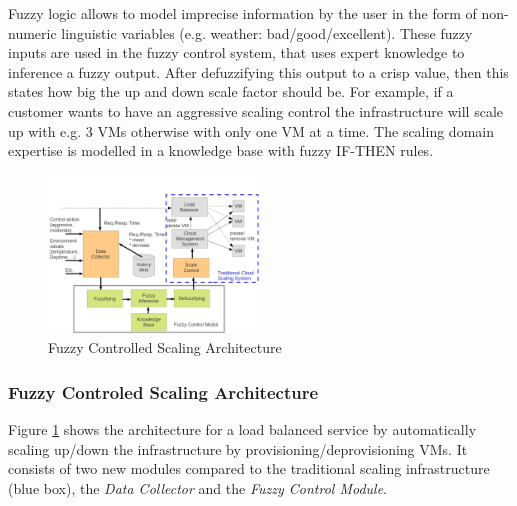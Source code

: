 Fuzzy logic allows to model imprecise information by the user in the form of non-numeric linguistic variables (e.g. weather: bad/good/excellent). These fuzzy inputs are used in the fuzzy control system, that uses expert knowledge to inference a fuzzy output. After defuzzifying this output to a crisp value, then this states how big the up and down scale factor should be. For example, if a customer wants to have an aggressive scaling control the infrastructure will scale up with e.g. 3 VMs otherwise with only one VM at a time. The scaling domain expertise is modelled in a knowledge base with fuzzy IF-THEN rules.


\begin{figure}[ht]
\begin{center}
\includegraphics[width=0.5\textwidth]{fig/architecture}
\end{center}
\caption{Fuzzy Controlled Scaling Architecture}
\label{fig:fuzzy_control_architecture}
\end{figure}

\subsubsection{Fuzzy Controled Scaling Architecture}\label{fuzzyScalingArchtecture}
Figure \ref{fig:fuzzy_control_architecture} shows the architecture for a load balanced service by automatically scaling up/down the infrastructure by provisioning/deprovisioning VMs. It consists of two new modules compared to the traditional scaling infrastructure (blue box), the \textit{Data Collector} and the \textit{Fuzzy Control Module}.

